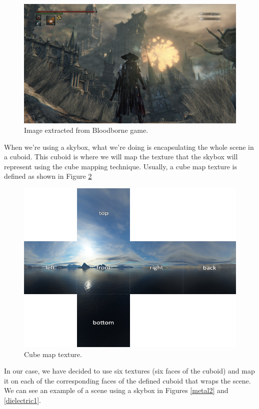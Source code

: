 \documentclass[titlepage,12pt]{report}
\begin{document}
\begin{figure}[H]
	\centering
	\includegraphics[scale=0.20]{media/skybox.png}
	\caption{Image extracted from Bloodborne game.}
	\label{skybox1}
\end{figure}

When we're using a skybox, what we're doing is encapsulating the whole scene in a cuboid. This cuboid is where we will map the texture that the skybox will represent using the cube mapping technique. Usually, a cube map texture is defined as shown in Figure \ref{skybox2}

\begin{figure}[H]
	\centering
	\includegraphics[scale=0.45]{media/cubemaps_skybox.png}
	\caption{Cube map texture.}
	\label{skybox2}
\end{figure}

In our case, we have decided to use six textures (six faces of the cuboid) and map it on each of the corresponding faces of the defined cuboid that wraps the scene. We can see an example of a scene using a skybox in Figures \ref{metal2} and \ref{dielectric1}.
\end{document}
